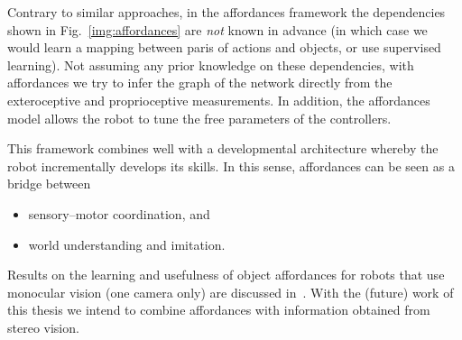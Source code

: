 Contrary to similar approaches, in the affordances framework the dependencies shown in Fig.~\ref{img:affordances} are \emph{not} known in advance (in which case we would learn a mapping between paris of actions and objects, or use supervised learning). Not assuming any prior knowledge on these dependencies, with affordances we try to infer the graph of the network directly from the exteroceptive and proprioceptive measurements. In addition, the affordances model allows the robot to tune the free parameters of the controllers.

This framework combines well with a developmental architecture whereby the robot incrementally develops its skills. In this sense, affordances can be seen as a bridge between
\begin{itemize}
\item sensory--motor coordination, and

\item world understanding and imitation.
\end{itemize}

Results on the learning and usefulness of object affordances for robots that use monocular vision (one camera only) are discussed in~\cite{montesano:2008}. With the (future) work of this thesis we intend to combine affordances with information obtained from stereo vision.